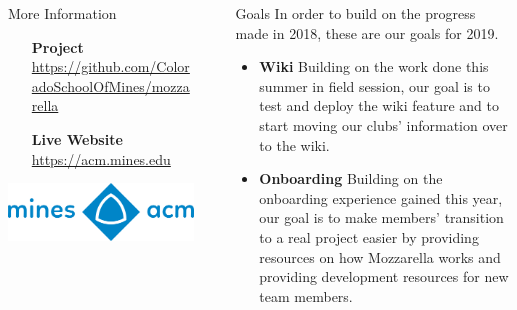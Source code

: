 \documentclass[final]{beamer}
\newlength{\sepwid}
\newlength{\onecolwid}
\begin{document}
\begin{frame}[t]
\begin{columns}[t]
\begin{column}{\onecolwid}
                \begin{alertblock}{More Information}

                    \begin{enumerate}[leftmargin=10.5cm, labelsep=1cm]

                        \item[\textbf{Project}]
                            \href{https://github.com/ColoradoSchoolOfMines/mozzarella}{\url{https://github.com/ColoradoSchoolOfMines/mozzarella}}

                        \item[\textbf{Live Website}]
			    \href{https://acm.mines.edu}{\url{https://acm.mines.edu}}
                    \end{enumerate}

                \end{alertblock}
		\includegraphics[width=.95\linewidth]{./full_2048.png}
            \end{column} %

            \begin{column}{\sepwid}\end{column} %

            \begin{column}{\onecolwid} %

                \begin{block}{Goals}
                    \setlength{\parskip}{0.5em}
		    In order to build on the progress made in 2018, these are
		    our goals for 2019.
                    \begin{itemize}

                        \item \textbf{Wiki} Building on the work done this
			    summer in field session, our goal is to test and
			    deploy the wiki feature and to start moving our
			    clubs' information over to the wiki.

                        \item \textbf{Onboarding} Building on the onboarding
			    experience gained this year, our goal is to make
			    members' transition to a real project easier by
			    providing resources on how Mozzarella works and
			    providing development resources for new team
			    members.


\end{itemize}
\end{block}
\end{column}
\end{columns}
\end{frame}
\end{document}
